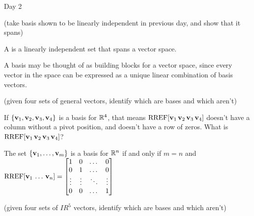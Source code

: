 
\begin{applicationActivities}{Day 2}

\begin{activity}{10}
  (take basis shown to be linearly independent in previous day, and
  show that it spans)
\end{activity}

\begin{definition}
  A  is a linearly independent set that spans a vector space.
\end{definition}

\begin{observation}
  A basis may be thought of as building blocks for a vector space, since
  every vector in the space can be expressed as a unique linear combination
  of basis vectors.
\end{observation}

\begin{activity}{15}
  (given four sets of general vectors, identify which are bases and which aren't)
\end{activity}

\begin{activity}{10}
  If \(\{\mathbf v_1,\mathbf v_2,\mathbf v_3,\mathbf v_4\}\) is a basis for
  \(\mathbb{R}^4\), that means \(\operatorname{RREF}[\mathbf v_1\,\mathbf v_2\,\mathbf v_3\,\mathbf v_4]\)
  doesn't have a column without a pivot position, and doesn't have a
  row of zeros. What is \(\operatorname{RREF}[\mathbf v_1\,\mathbf v_2\,\mathbf v_3\,\mathbf v_4]\)?
\end{activity}

\begin{fact}
  The set \(\{\mathbf v_1,\dots,\mathbf v_m\}\) is a basis for \(\mathbb{R}^n\) if and
  only if \(m=n\) and
  \(\operatorname{RREF}[\mathbf v_1\,\dots\,\mathbf v_n]=
  \begin{bmatrix}
    1&0&\dots&0\\
    0&1&\dots&0\\
    \vdots&\vdots&\ddots&\vdots\\
    0&0&\dots&1
  \end{bmatrix}
  \)
\end{fact}

\begin{activity}{15}
  (given four sets of \(IR^5\) vectors, identify which are bases and which
  aren't)
\end{activity}

\end{applicationActivities}
